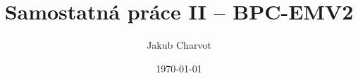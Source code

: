 \documentclass[a4paper,onecolumn,12pt]{article}
\begin{document}
\title{Samostatná práce II – BPC-EMV2}
\author{Jakub Charvot}
\date{\czdate\today}
\maketitle













\end{document}
